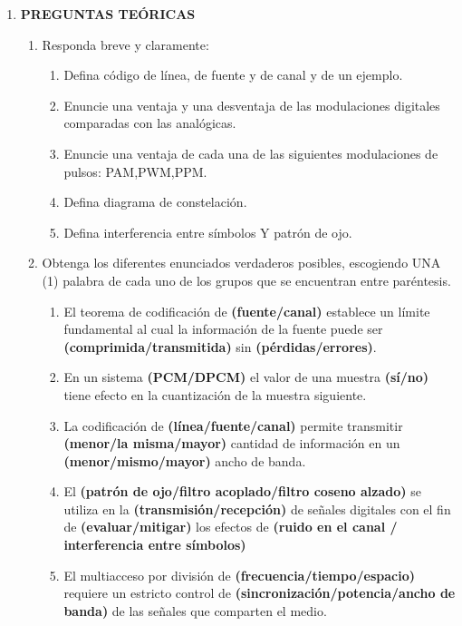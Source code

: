 \pagebreak
\begin{enumerate}
	\item \textbf{PREGUNTAS TEÓRICAS}
	\\
	
	
	\begin{enumerate}
		\item Responda breve y claramente:
		\begin{enumerate}
			\item Defina código de línea, de fuente y de canal  y de un ejemplo.
			\item Enuncie una ventaja y una desventaja de las modulaciones digitales comparadas con las analógicas.
			\item Enuncie una ventaja de cada una de las siguientes modulaciones de pulsos: PAM,PWM,PPM.
			\item Defina diagrama de constelación.
			
			\item Defina interferencia entre símbolos Y patrón de ojo.
			
		\end{enumerate}
		\item Obtenga los diferentes enunciados verdaderos posibles, escogiendo UNA (1) palabra de cada uno de los grupos que se encuentran entre paréntesis.
		
		\begin{enumerate}
			\item El teorema de codificación de \textbf{(fuente/canal)} establece un límite fundamental al cual la información de la fuente puede ser \textbf{(comprimida/transmitida)} sin \textbf{(pérdidas/errores)}.
			
			\item 
			En un sistema \textbf{(PCM/DPCM)} el valor de una muestra \textbf{(sí/no)} tiene efecto en la cuantización de la muestra siguiente.
			
			\item 
			La codificación de \textbf{(línea/fuente/canal)} permite transmitir \textbf{(menor/la misma/mayor)} cantidad de información en un \textbf{(menor/mismo/mayor)} ancho de banda.
			
			\item  
			El \textbf{(patrón de ojo/filtro acoplado/filtro coseno alzado)} se utiliza en la \textbf{(transmisión/recepción)} de señales digitales con el fin de \textbf{(evaluar/mitigar)} los efectos de \textbf{(ruido en el canal / interferencia entre símbolos)}
			
			\item  
			El multiacceso por división de \textbf{(frecuencia/tiempo/espacio)} requiere un estricto control de \textbf{(sincronización/potencia/ancho de banda)} de las señales que comparten el medio. 
			

\end{enumerate}
\end{enumerate}
\end{enumerate}
